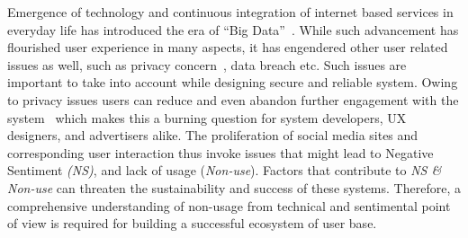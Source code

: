 Emergence of technology and continuous integration of internet based services in everyday life has introduced the era of ``Big Data''~\cite{lohr2012age}. While such advancement has flourished user experience in many aspects, it has engendered other user related issues as well, such as privacy concern~\cite{shin2010effects}, data breach etc. Such issues are important to take into account while designing secure and reliable system. Owing to privacy issues users can reduce and even abandon further engagement with the system~\cite{madden2012privacy} which makes this a burning question for system developers, UX designers, and advertisers alike. The proliferation of social media sites and corresponding user interaction thus invoke issues that might lead to Negative Sentiment \emph{(NS)}, and lack of usage (\emph{Non-use}). Factors that contribute to \emph{NS \& Non-use} can threaten the sustainability and success of these systems. Therefore, a comprehensive understanding of non-usage from technical and sentimental point of view is required for building a successful ecosystem of user base.


